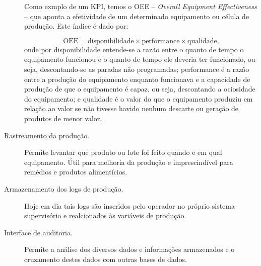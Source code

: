 \begin{description}
	Como exmplo de um KPI, temos o OEE -- \emph{Overall Equipment Effectiveness} -- que aponta a efetividade de um determinado equipamento ou célula de produção. Este índice é dado por:

\begin{equation}
	\text{OEE} = \text{disponibilidade}\times\text{performance}\times\text{qualidade,}
\end{equation}
onde por disponibilidade entende-se a razão entre o quanto de tempo o equipamento funcionou e o quanto de tempo ele deveria ter funcionado, ou seja, descontando-se as paradas não programadas; performance é a razão entre a produção do equipamento enquanto funcionava e a capacidade de produção de que o equipamento é capaz, ou seja, descontando a ociosidade do equipamento; e qualidade é o valor do que o equipamento produziu em relação ao valor se não tivesse havido nenhum descarte ou geração de produtos de menor valor.

	\item[Rastreamento da produção.] Permite levantar que produto ou lote foi feito quando e em qual equipamento. Útil para melhoria da produção e imprescindível para remédios e produtos alimentícios.
	\item[Armazenamento dos logs de produção.] Hoje em dia tais logs são inseridos pelo operador no próprio sistema supervisório e realcionados às variáveis de produção.
	\item[Interface de auditoria.] Permite a análise dos diversos dados e informações armazenados e o cruzamento destes dados com outras bases de dados.
\end{description}